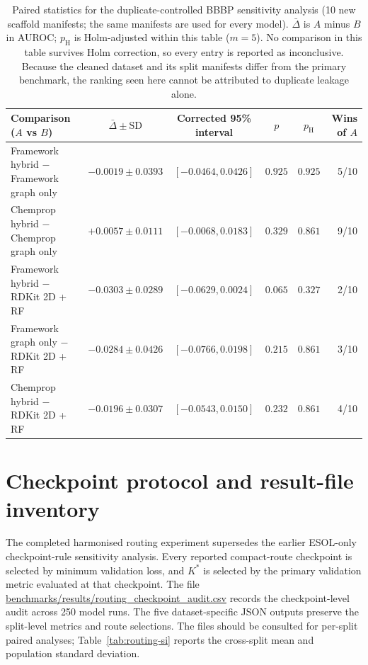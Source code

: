 \documentclass[10pt,a4paper]{article}
\renewcommand{\thetable}{S\arabic{table}}
\begin{document}
\begin{table}[H]
\renewcommand{\thetable}{S17}
\caption{Paired statistics for the duplicate-controlled BBBP sensitivity analysis (10 new scaffold manifests; the same manifests are used for every model). $\bar\Delta$ is $A$ minus $B$ in AUROC; $p_{\mathrm{H}}$ is Holm-adjusted within this table ($m=5$). No comparison in this table survives Holm correction, so every entry is reported as inconclusive. Because the cleaned dataset and its split manifests differ from the primary benchmark, the ranking seen here cannot be attributed to duplicate leakage alone.}\label{tab:bbbp-sensitivity-stats}
\centering\scriptsize
\setlength{\tabcolsep}{4pt}
\begin{tabular}{@{}lccccr@{}}
\toprule
Comparison ($A$ vs $B$) & $\bar\Delta\pm\mathrm{SD}$ & Corrected 95\% interval & $p$ & $p_{\mathrm{H}}$ & Wins of $A$ \\
\midrule
Framework hybrid $-$ Framework graph only & $-0.0019\pm0.0393$ & $[-0.0464,0.0426]$ & $0.925$ & $0.925$ & 5/10 \\
Chemprop hybrid $-$ Chemprop graph only & $+0.0057\pm0.0111$ & $[-0.0068,0.0183]$ & $0.329$ & $0.861$ & 9/10 \\
Framework hybrid $-$ RDKit 2D + RF & $-0.0303\pm0.0289$ & $[-0.0629,0.0024]$ & $0.065$ & $0.327$ & 2/10 \\
Framework graph only $-$ RDKit 2D + RF & $-0.0284\pm0.0426$ & $[-0.0766,0.0198]$ & $0.215$ & $0.861$ & 3/10 \\
Chemprop hybrid $-$ RDKit 2D + RF & $-0.0196\pm0.0307$ & $[-0.0543,0.0150]$ & $0.232$ & $0.861$ & 4/10 \\
\bottomrule
\end{tabular}
\end{table}
\addtocounter{table}{-1}

\section*{Checkpoint protocol and result-file inventory}

The completed harmonised routing experiment supersedes the earlier ESOL-only checkpoint-rule sensitivity analysis. Every reported compact-route checkpoint is selected by minimum validation loss, and $K^*$ is selected by the primary validation metric evaluated at that checkpoint. The file \url{benchmarks/results/routing_checkpoint_audit.csv} records the checkpoint-level audit across 250 model runs. The five dataset-specific JSON outputs preserve the split-level metrics and route selections. The files should be consulted for per-split paired analyses; Table~\ref{tab:routing-si} reports the cross-split mean and population standard deviation.
\end{document}
